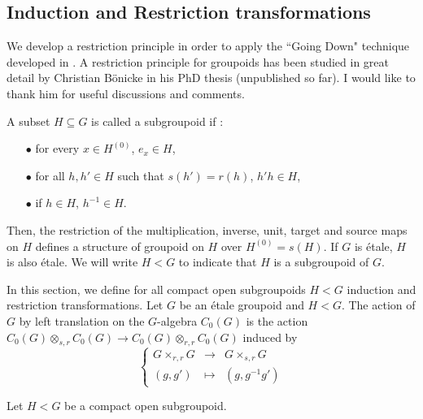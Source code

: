 \subsection{Induction and Restriction transformations}

We develop a restriction principle in order to apply the ``Going Down" technique developed in \cite{ChabertEOY}. A restriction principle for groupoids has been studied in great detail by Christian Bönicke in his PhD thesis (unpublished so far). I would like to thank him for useful discussions and comments.

\begin{definition} A subset $H\subseteq G$ is called a subgroupoid if :
\begin{itemize}
\item[$\bullet$] for every $x\in H^{(0)}$, $e_x\in H$,
\item[$\bullet$] for all $h,h'\in H $ such that $s(h') = r(h)$, $h'h \in H$,
\item[$\bullet$] if $h\in H$, $h^{-1}\in H$.
\end{itemize}
Then, the restriction of the multiplication, inverse, unit, target and source maps on $H$ defines a structure of groupoid on $H$ over $H^{(0)} = s(H)$. If $G$ is étale, $H$ is also étale. We will write $H< G$ to indicate that $H$ is a subgroupoid of $G$.
\end{definition}

In this section, we define for all compact open subgroupoids $H < G$ induction and restriction transformations. Let $G$ be an étale groupoid and $H<G$. The action of $G$ by left translation on the $G$-algebra $C_0(G)$ is the action $C_0(G)\otimes_{s,r} C_0(G) \rightarrow C_0(G)\otimes_{r,r} C_0(G)$ induced by 
\[\left\{ \begin{array}{rcl}
G\times_{r,r} G & \rightarrow & G\times_{s,r} G \\
(g,g') & \mapsto  & (g,g^{-1}g')  
\end{array}\right.\] 

Let $H < G$ be a compact open subgroupoid.\\

